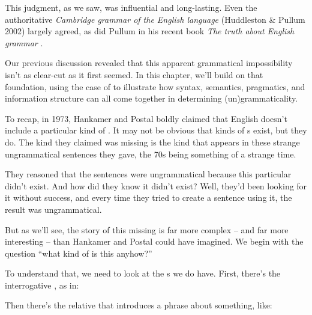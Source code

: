 This judgment, as we saw, was influential and long-lasting. Even the authoritative \textit{Cambridge grammar of the English language} (Huddleston \& Pullum 2002) largely agreed, as did Pullum in his recent book \textit{The truth about English grammar} \citep{pullum2024truth}.

Our previous discussion revealed that this apparent grammatical impossibility isn't as clear-cut as it first seemed. In this chapter, we'll build on that foundation, using the case of  to illustrate how syntax, semantics, pragmatics, and information structure can all come together in determining (un)grammaticality.

\bigskip

To recap, in 1973, Hankamer and Postal boldly claimed that English doesn't include a particular kind of . It may not be obvious that kinds of s exist, but they do. The kind they claimed was missing is the kind that appears in these strange ungrammatical sentences they gave, the 70s being something of a strange time.

\z

They reasoned that the sentences were ungrammatical because this particular  didn't exist. And how did they know it didn't exist? Well, they'd been looking for it without success, and every time they tried to create a sentence using it, the result was ungrammatical.

But as we'll see, the story of this missing  is far more complex -- and far more interesting -- than Hankamer and Postal could have imagined. We begin with the question \enquote{what kind of  is this anyhow?}

To understand that, we need to look at the s we do have. First, there's the interrogative , as in:

\z

Then there's the relative  that introduces a phrase about something, like:

\z

